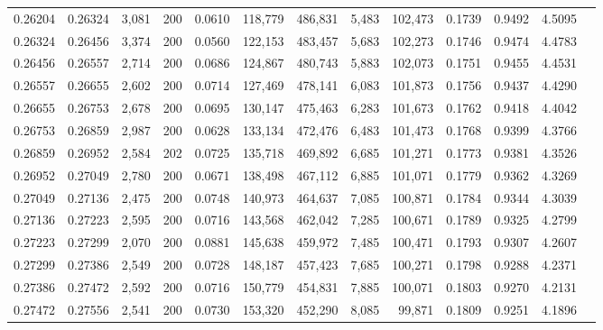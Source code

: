 \begin{tabular}{rrrrrrrrrrrrr}
0.26204 & 0.26324 & 3,081 & 200 &                                     0.0610 & 118,779 & 486,831 &   5,483 & 102,473 & 0.1739 & 0.9492 & 4.5095 \\
0.26324 & 0.26456 & 3,374 & 200 &                                     0.0560 & 122,153 & 483,457 &   5,683 & 102,273 & 0.1746 & 0.9474 & 4.4783 \\
0.26456 & 0.26557 & 2,714 & 200 &                                     0.0686 & 124,867 & 480,743 &   5,883 & 102,073 & 0.1751 & 0.9455 & 4.4531 \\
0.26557 & 0.26655 & 2,602 & 200 &                                     0.0714 & 127,469 & 478,141 &   6,083 & 101,873 & 0.1756 & 0.9437 & 4.4290 \\
0.26655 & 0.26753 & 2,678 & 200 &                                     0.0695 & 130,147 & 475,463 &   6,283 & 101,673 & 0.1762 & 0.9418 & 4.4042 \\
0.26753 & 0.26859 & 2,987 & 200 &                                     0.0628 & 133,134 & 472,476 &   6,483 & 101,473 & 0.1768 & 0.9399 & 4.3766 \\
0.26859 & 0.26952 & 2,584 & 202 &                                     0.0725 & 135,718 & 469,892 &   6,685 & 101,271 & 0.1773 & 0.9381 & 4.3526 \\
0.26952 & 0.27049 & 2,780 & 200 &                                     0.0671 & 138,498 & 467,112 &   6,885 & 101,071 & 0.1779 & 0.9362 & 4.3269 \\
0.27049 & 0.27136 & 2,475 & 200 &                                     0.0748 & 140,973 & 464,637 &   7,085 & 100,871 & 0.1784 & 0.9344 & 4.3039 \\
0.27136 & 0.27223 & 2,595 & 200 &                                     0.0716 & 143,568 & 462,042 &   7,285 & 100,671 & 0.1789 & 0.9325 & 4.2799 \\
0.27223 & 0.27299 & 2,070 & 200 &                                     0.0881 & 145,638 & 459,972 &   7,485 & 100,471 & 0.1793 & 0.9307 & 4.2607 \\
0.27299 & 0.27386 & 2,549 & 200 &                                     0.0728 & 148,187 & 457,423 &   7,685 & 100,271 & 0.1798 & 0.9288 & 4.2371 \\
0.27386 & 0.27472 & 2,592 & 200 &                                     0.0716 & 150,779 & 454,831 &   7,885 & 100,071 & 0.1803 & 0.9270 & 4.2131 \\
0.27472 & 0.27556 & 2,541 & 200 &                                     0.0730 & 153,320 & 452,290 &   8,085 &  99,871 & 0.1809 & 0.9251 & 4.1896 \\

\end{tabular}
